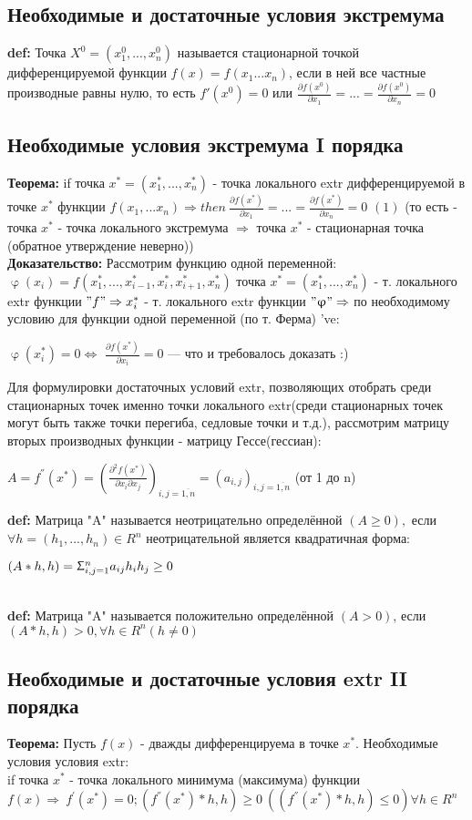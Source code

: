 \documentclass[a4paper]{article}
\newcommand{\cent}[1]{\begin{center}{#1}\end{center}} %
\begin{document}
\subsection*{Необходимые и достаточные условия экстремума}
\textbf{def:} Точка $X^0=(x^0_1,...,x^0_n)$ называется стационарной точкой дифференцируемой функции $f(x)=f(x_1... x_n)$, если в ней все частные производные равны нулю, то есть $f'(x^0)=0$ или $\frac{\partial f(x^0)}{\partial x_1} = ... = \frac{\partial f(x^0)}{\partial x_n} = 0$
\subsection*{Необходимые условия экстремума I порядка}
\textbf{Теорема: }if точка $x^*=(x_1^*, ..., x_n^*)$ - точка локального extr дифференцируемой в точке $x^* $ функции $ f(x_1, ... x_n) \Rightarrow then \ \frac{\partial f(x^*)}{\partial x_1} = ... = \frac{\partial f(x^*)}{\partial x_n} = 0$ $(1)$ (то есть - точка $x^{*}$ - точка локального экстремума $\Rightarrow$ точка $x^{*}$ - стационарная точка (обратное утверждение неверно)) \\ [2mm]
\textbf{Доказательство:} Рассмотрим функцию одной переменной:\\ $\upvarphi (x_i)=f(x_1^*,..., x_{i-1}^*, x_i^*, x_{i+1}^*, x_n^*)$ точка $x^*=(x_1^*,...,x_n^*)$ - т. локального extr функции $"f" \Rightarrow x_i^*$ - т. локального extr функции $"\upvarphi" \Rightarrow$ по необходимому условию для функции одной переменной (по т. Ферма) 've:
\begin{center}
$\upvarphi(x_i^*)=0 \Leftrightarrow $ $\frac{\partial f(x^*)}{\partial x_i} = 0$ --- что и требовалось доказать :)
\end{center}
Для формулировки достаточных условий extr, позволяющих отобрать среди стационарных точек именно точки локального extr(среди стационарных точек могут быть также точки перегиба, седловые точки и т.д.), рассмотрим матрицу вторых производных функции - матрицу Гессе(гессиан):
\cent{$A=f^{''}(x^*) = (\frac{\partial ^2 f(x^*)}{\partial x_i \partial x_j})_{i, j = \overline{1, n}} = (a_{i, j})_{i, j = \overline{1,n}}$ (от 1 до n)}
\textbf{def:} Матрица "A" называется неотрицательно определённой $(A \geq 0),$  если $\forall h = (h_1,...,h_n) \in R^n$ неотрицательной является квадратичная форма:
\cent{$(A*h, h) = \Upsigma _{i, j = 1}^n a_{ij}h_ih_j \geq 0$} \\ [2mm]
\textbf{def:} Матрица "A" называется положительно определённой $(A>0)$, если $(A*h, h)>0, \forall h \in R^n (h \neq 0)$
\newpage
\subsection*{Необходимые и достаточные условия extr II порядка}
\textbf{Теорема:} Пусть $f(x)$ - дважды дифференцируема в точке $x^*$. Необходимые условия условия extr: \\
if точка $x^*$ - точка локального минимума (максимума) функции $
f(x) \Rightarrow \  f^{'}(x^*)=0; (f^{''}(x^*)*h, h) \geq 0 \ ((f^{''}(x^*)*h, h) \leq 0) \forall h \in R^n$
\end{document}
